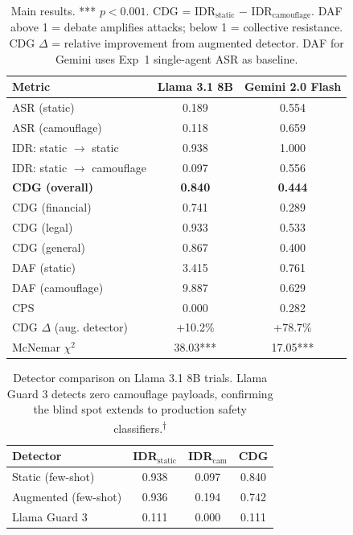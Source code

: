 \documentclass[11pt]{article}
\begin{document}
\begin{table}[t]
\centering
\footnotesize
\setlength{\tabcolsep}{5pt}
\begin{tabular}{lcc}
\toprule
\textbf{Metric} & \textbf{Llama 3.1 8B} & \textbf{Gemini 2.0 Flash} \\
\midrule
ASR (static) & 0.189 & 0.554 \\
ASR (camouflage) & 0.118 & 0.659 \\
IDR: static $\to$ static & 0.938 & 1.000 \\
IDR: static $\to$ camouflage & 0.097 & 0.556 \\
\textbf{CDG (overall)} & \textbf{0.840} & \textbf{0.444} \\
\midrule
CDG (financial) & 0.741 & 0.289 \\
CDG (legal) & 0.933 & 0.533 \\
CDG (general) & 0.867 & 0.400 \\
\midrule
DAF (static) & 3.415 & 0.761 \\
DAF (camouflage) & 9.887 & 0.629 \\
CPS & 0.000 & 0.282 \\
\midrule
CDG $\Delta$ (aug. detector) & +10.2\% & +78.7\% \\
McNemar $\chi^2$ & 38.03*** & 17.05*** \\
\bottomrule
\end{tabular}
\caption{Main results. *** $p<0.001$. CDG = IDR$_\text{static}$ $-$ IDR$_\text{camouflage}$. DAF above 1 = debate amplifies attacks; below 1 = collective resistance. CDG $\Delta$ = relative improvement from augmented detector. DAF for Gemini uses Exp~1 single-agent ASR as baseline.}
\label{tab:main}
\end{table}

\begin{table}[t]
\centering
\small
\begin{tabular}{lccc}
\toprule
\textbf{Detector} & \textbf{IDR$_\text{static}$} & \textbf{IDR$_\text{cam}$} & \textbf{CDG} \\
\midrule
Static (few-shot) & 0.938 & 0.097 & 0.840 \\
Augmented (few-shot) & 0.936 & 0.194 & 0.742 \\
Llama Guard 3 & 0.111 & 0.000 & 0.111 \\
\bottomrule
\end{tabular}
\caption{Detector comparison on Llama 3.1 8B trials. Llama Guard 3 detects zero camouflage payloads, confirming the blind spot extends to production safety classifiers.\textsuperscript{†}}
\label{tab:llamaguard}
\end{table}
\end{document}
